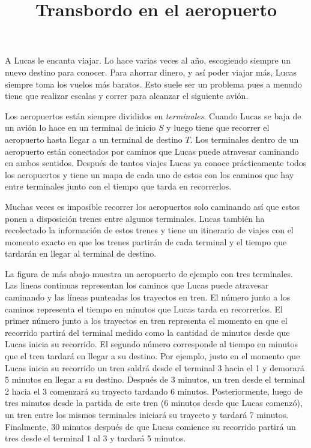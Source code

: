 \documentclass{oci}
\title{Transbordo en el aeropuerto}
\begin{document}
\begin{problemDescription}
  A Lucas le encanta viajar.
  Lo hace varias veces al año, escogiendo siempre un nuevo destino para conocer.
  Para ahorrar dinero, y así poder viajar más, Lucas siempre toma los vuelos más
  baratos.
  Esto suele ser un problema pues a menudo tiene que realizar escalas y correr
  para alcanzar el siguiente avión.

  Los aeropuertos están siempre divididos en \emph{terminales}.
  Cuando Lucas se baja de un avión lo hace en un terminal de inicio $S$ y luego
  tiene que recorrer el aeropuerto hasta llegar a un terminal de destino
  $T$.
  Los terminales dentro de un aeropuerto están conectados por caminos que Lucas
  puede atravesar caminando en ambos sentidos.
  Después de tantos viajes Lucas ya conoce prácticamente todos los aeropuertos
  y tiene un mapa de cada uno de estos con los caminos que hay entre terminales
  junto con el tiempo que tarda en recorrerlos.

  Muchas veces es imposible recorrer los aeropuertos solo caminando así que
  estos ponen a disposición trenes entre algunos terminales.
  Lucas también ha recolectado la información de estos trenes y tiene un
  itinerario de viajes con el momento exacto en que los trenes partirán de cada
  terminal y el tiempo que tardarán en llegar al terminal de destino.

  La figura de más abajo muestra un aeropuerto de ejemplo con tres terminales.
  Las lineas continuas representan los caminos que Lucas puede atravesar
  caminando y las líneas punteadas los trayectos en tren.
  El número junto a los caminos representa el tiempo en minutos que Lucas tarda
  en recorrerlos.
  El primer número junto a los trayectos en tren representa el momento en que
  el recorrido partirá del terminal medido como la cantidad de minutos desde
  que Lucas inicia su recorrido.
  El segundo número corresponde al tiempo en minutos que el tren tardará en
  llegar a su destino.
  Por ejemplo, justo en el momento que Lucas inicia su recorrido un tren saldrá
  desde el terminal 3 hacia el 1 y demorará 5 minutos en llegar a su destino.
  Después de 3 minutos, un tren desde el terminal 2 hacia el 3 comenzará su
  trayecto tardando 6 minutos.
  Posteriormente, luego de tres minutos desde la partida de este tren (6 minutos
  desde que Lucas comenzó), un tren entre los mismos terminales iniciará su
  trayecto y tardará 7 minutos.
  Finalmente, 30 minutos después de que Lucas comience su recorrido partirá un
  tres desde el terminal 1 al 3 y tardará 5 minutos.


\end{problemDescription}
\end{document}
